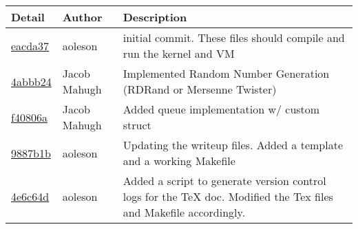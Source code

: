 \begin{tabular}{l l l}\textbf{Detail} & \textbf{Author} & \textbf{Description}\\\hline
\href{git@github.com:aoleson/cs444/commit/eacda375043af0c890654149a289a781c0d558cf}{eacda37} & aoleson & initial commit. These files should compile and run the kernel and VM\\\hline
\href{git@github.com:aoleson/cs444/commit/4abbb240a90bdba422c608f9917f45b501decaac}{4abbb24} & Jacob Mahugh & Implemented Random Number Generation (RDRand or Mersenne Twister)\\\hline
\href{git@github.com:aoleson/cs444/commit/f40806a12aac697608b0364de9c29d803cbb688f}{f40806a} & Jacob Mahugh & Added queue implementation w/ custom struct\\\hline
\href{git@github.com:aoleson/cs444/commit/9887b1bce65d52ad32789073e14cdbdf505287cb}{9887b1b} & aoleson & Updating the writeup files. Added a template and a working Makefile\\\hline
\href{git@github.com:aoleson/cs444/commit/4e6c64d648c1ebccc697c451c50de5077be7ca20}{4e6c64d} & aoleson & Added a script to generate version control logs for the TeX doc. Modified the Tex files and Makefile accordingly.\\\hline\end{tabular}
